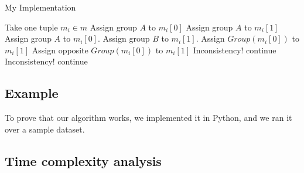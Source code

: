 \documentclass{article}
\begin{document}
\begin{algorithm}[H]
\caption{My Implementation}
\begin{algorithmic}[1]
 \State Take one tuple $m_i \in m$
   \State Assign group $A$ to $m_i[0]$
   \State Assign group $A$ to $m_i[1]$
   \State Assign group $A$ to $m_i[0]$.
   \State Assign group $B$ to $m_i[1]$.
  \EndIf
 \EndIf
   \State Assign $Group(m_i[0])$ to $m_i[1]$
   \State Assign opposite $Group(m_i[0])$ to $m_i[1]$
  \EndIf
 \EndIf
    \State Inconsistency!
   \Else
    \State continue
   \EndIf
    \State Inconsistency!
   \Else
    \State continue
   \EndIf
  \EndIf
 \EndIf
\EndWhile
\end{algorithmic}
\end{algorithm}

\subsection*{Example}

To prove that our algorithm works, we implemented it in Python, and we ran it over a sample dataset.




\subsection*{Time complexity analysis}
\end{document}

